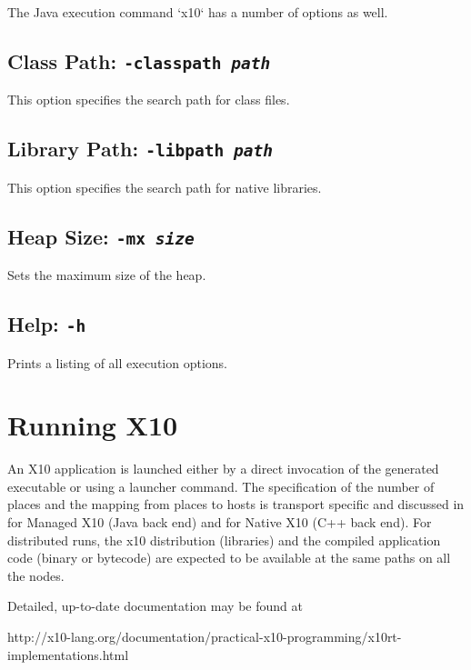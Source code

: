 The Java execution command \xcd`x10` has a number of options as well. 

\subsection{Class Path: {\tt -classpath {\em path}}}

This option specifies the search path for class files. 

\subsection{Library Path: {\tt -libpath {\em path}}}

This option specifies the search path for native libraries.

\subsection{Heap Size: {\tt -mx {\em size}}}

Sets the maximum size of the heap. 

\subsection{Help: {\tt -h}}

Prints a listing of all execution options.





\section{Running X10}

An X10 application is launched either by a direct invocation of the generated
executable or using a launcher command. The specification of the number of
places and the mapping from places to hosts is transport specific and
discussed in  for Managed X10 (Java back end) and
 for Native X10 (C++ back end). For distributed runs,
the x10 distribution (libraries) and the compiled application code (binary or
bytecode) are expected to be available at the same paths on all the nodes.  

Detailed, up-to-date documentation may be found at
\begin{xten}
http://x10-lang.org/documentation/practical-x10-programming/x10rt-implementations.html
\end{xten}


